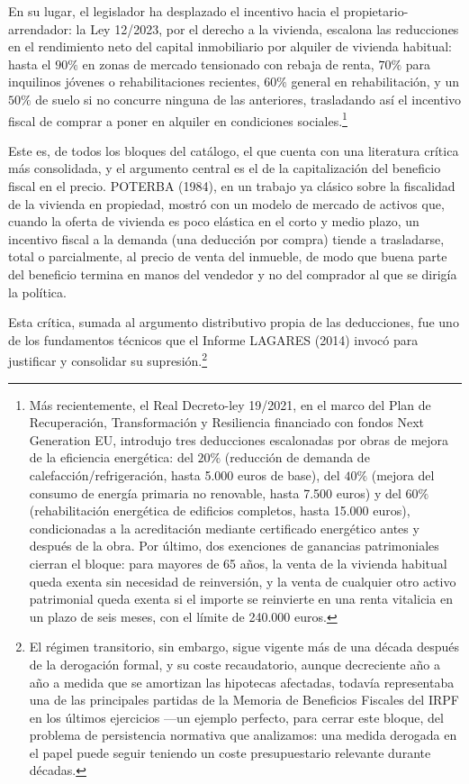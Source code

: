\documentclass[10pt,a4paper]{article}
\begin{document}
En su lugar, el legislador ha desplazado el incentivo hacia el propietario-arrendador: la Ley 12/2023, por el derecho a la vivienda, escalona las reducciones en el rendimiento neto del capital inmobiliario por alquiler de vivienda habitual: hasta el $90\%$ en zonas de mercado tensionado con rebaja de renta, $70\%$ para inquilinos jóvenes o rehabilitaciones recientes, $60\%$ general en rehabilitación, y un $50\%$ de suelo si no concurre ninguna de las anteriores, trasladando así el incentivo fiscal de comprar a poner en alquiler en condiciones sociales.\footnote{%
    Más recientemente, el Real Decreto-ley 19/2021, en el marco del Plan de Recuperación, Transformación y Resiliencia financiado con fondos Next Generation EU, introdujo tres deducciones escalonadas por obras de mejora de la eficiencia energética: del $20\%$ (reducción de demanda de calefacción/refrigeración, hasta 5.000 euros de base), del $40\%$ (mejora del consumo de energía primaria no renovable, hasta 7.500 euros) y del $60\%$ (rehabilitación energética de edificios completos, hasta 15.000 euros), condicionadas a la acreditación mediante certificado energético antes y después de la obra. Por último, dos exenciones de ganancias patrimoniales cierran el bloque: para mayores de 65 años, la venta de la vivienda habitual queda exenta sin necesidad de reinversión, y la venta de cualquier otro activo patrimonial queda exenta si el importe se reinvierte en una renta vitalicia en un plazo de seis meses, con el límite de 240.000 euros.
}

Este es, de todos los bloques del catálogo, el que cuenta con una literatura crítica más consolidada, y el argumento central es el de la capitalización del beneficio fiscal en el precio. POTERBA (1984), en un trabajo ya clásico sobre la fiscalidad de la vivienda en propiedad, mostró con un modelo de mercado de activos que, cuando la oferta de vivienda es poco elástica en el corto y medio plazo, un incentivo fiscal a la demanda (una deducción por compra) tiende a trasladarse, total o parcialmente, al precio de venta del inmueble, de modo que buena parte del beneficio termina en manos del vendedor y no del comprador al que se dirigía la política. 

Esta crítica, sumada al argumento distributivo propia de las deducciones, fue uno de los fundamentos técnicos que el Informe LAGARES (2014) invocó para justificar y consolidar su supresión.\footnote{%
    El régimen transitorio, sin embargo, sigue vigente más de una década después de la derogación formal, y su coste recaudatorio, aunque decreciente año a año a medida que se amortizan las hipotecas afectadas, todavía representaba una de las principales partidas de la Memoria de Beneficios Fiscales del IRPF en los últimos ejercicios —un ejemplo perfecto, para cerrar este bloque, del problema de persistencia normativa que analizamos: una medida derogada en el papel puede seguir teniendo un coste presupuestario relevante durante décadas.
}
\end{document}
